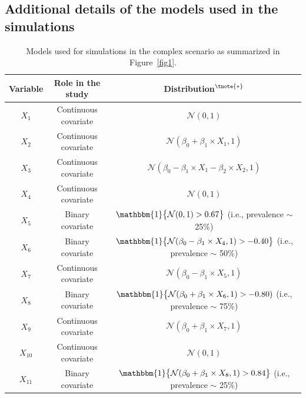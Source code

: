 \documentclass{article}
\begin{document}
\clearpage




\newpage
\subsection*{Additional details of the models used in the simulations}\label{app1}
 
    
\begin{center}
\begin{table}[!ht]%
\scriptsize
\caption{Models used for simulations in the complex scenario as summarized in Figure~\ref{fig1}.\label{tabS1}}
\begin{tabular*}{\textwidth}{@{\extracolsep\fill}ccc@{}}
\toprule
\textbf{Variable} &  \textbf{Role in the study}  & \textbf{Distribution}$^{\tnote{\bf *}}$   \\ \hline
$X_1$  & Continuous   covariate  & $\mathcal{N} (0,1)$           \\
$X_2$  & Continuous    covariate &      $\mathcal{N} (\beta_0 + \beta_1 \times X_1, 1)$               \\
$X_3$   & Continuous  covariate  &    $\mathcal{N} (\beta_0  - \beta_1  \times X_1 -  \beta_2  \times X_2 , 1)$               \\
$X_4$  & Continuous   covariate &        $\mathcal{N} (0,1)$               \\
$X_5$  & Binary   covariate  &               $\mathbbm{1} \big \{ \mathcal{N} (0,1)> 0.67 \big \}$  (i.e., prevalence $\sim$ 25\%)              \\
$X_6$  & Binary   covariate  &       $\mathbbm{1} \big \{ \mathcal{N} (\beta_0 - \beta_1 \times X_4, 1)> -0.40 \big \}$  (i.e., prevalence $\sim$  50\%)         \\
$X_7$ & Continuous   covariate &          $\mathcal{N} (\beta_0 - \beta_1 \times X_5,  1)$         \\
$X_8$  & Binary  covariate    &         $\mathbbm{1} \big \{  \mathcal{N} (\beta_0 + \beta_1 \times X_6,  1)> -0.80)$  (i.e., prevalence $\sim$  75\%)    \\
$X_9$  & Continuous   covariate &   $\mathcal{N} (\beta_0 + \beta_1 \times X_7, 1)$  \\
$X_{10}$  & Continuous  covariate   &  $\mathcal{N} (0,1)$ \\
$X_{11}$  & Binary  covariate   & $\mathbbm{1}  \big \{  \mathcal{N} (\beta_0 + \beta_1 \times X_8, 1)> 0.84 \big \}$ (i.e., prevalence $\sim$  25\%)  \\

\end{tabular*}
\end{table}
\end{center}
\end{document}
